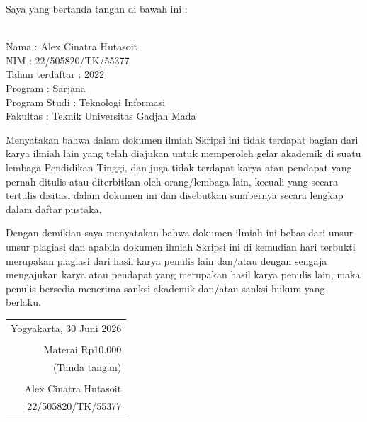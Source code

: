 \noindent Saya yang bertanda tangan di bawah ini :

\vspace{-1em}

\begin{tabbing}
\hspace{40mm} \= \\ %
\noindent Nama \> : Alex Cinatra Hutasoit\\[\parskip]
\noindent NIM \> : 22/505820/TK/55377 \\[\parskip]
\noindent Tahun terdaftar \> :  2022\\[\parskip]
\noindent Program \> : Sarjana \\[\parskip]
\noindent Program Studi \> :  Teknologi Informasi\\[\parskip]
\noindent Fakultas \> : Teknik Universitas Gadjah Mada
\end{tabbing}

\noindent Menyatakan bahwa dalam dokumen ilmiah Skripsi ini tidak terdapat bagian dari karya ilmiah lain yang telah diajukan untuk memperoleh gelar akademik di suatu lembaga Pendidikan Tinggi, dan juga tidak terdapat karya atau pendapat yang pernah ditulis atau diterbitkan oleh orang/lembaga lain, kecuali yang secara tertulis disitasi dalam dokumen ini dan disebutkan sumbernya secara lengkap dalam daftar pustaka.

\noindent Dengan demikian saya menyatakan bahwa dokumen ilmiah ini bebas dari unsur-unsur plagiasi dan apabila dokumen ilmiah Skripsi ini di kemudian hari terbukti merupakan plagiasi dari hasil karya penulis lain dan/atau dengan sengaja mengajukan karya atau pendapat yang merupakan hasil karya penulis lain, maka penulis bersedia menerima sanksi akademik dan/atau sanksi hukum yang berlaku.


\begin{flushright}
	\begin{tabular}{r}
		Yogyakarta, 30 Juni 2026 \\
		\vspace{0.1cm} \\
		\tiny{Materai Rp10.000} \\
		\tiny{(Tanda tangan)} \\	
		\vspace{0.1cm} \\
		Alex Cinatra Hutasoit \\ 22/505820/TK/55377
	\end{tabular}
\end{flushright}